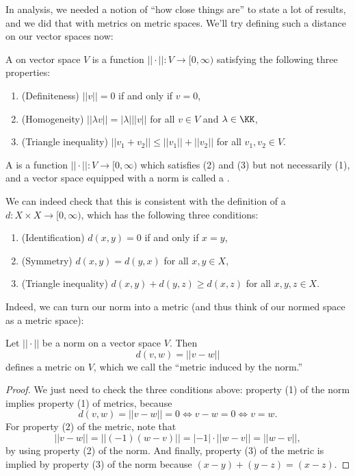 In analysis, we needed a notion of ``how close things are'' to state a lot of results, and we did that with metrics on metric spaces. We'll try defining such a distance on our vector spaces now:

\begin{definition}
A  on vector space $V$ is a function $||\cdot||: V \to [0, \infty)$ satisfying the following three properties:
\begin{enumerate}
    \item (Definiteness) $||v|| = 0$ if and only if $v = 0$,
    \item (Homogeneity) $||\lambda v|| = |\lambda| ||v||$ for all $v \in V$ and $\lambda \in \KK$,
    \item (Triangle inequality) $||v_1+v_2|| \le ||v_1|| + ||v_2||$ for all $v_1, v_2 \in V$.
\end{enumerate}
A  is a function $||\cdot||: V \to [0, \infty)$ which satisfies (2) and (3) but not necessarily (1), and a vector space equipped with a norm is called a .
\end{definition}

We can indeed check that this is consistent with the definition of a  $d: X \times X \to [0, \infty)$, which has the following three conditions:
\begin{enumerate}
    \item (Identification) $d(x, y) = 0$ if and only if $x = y$,
    \item (Symmetry) $d(x, y) = d(y, x)$ for all $x, y \in X$,
    \item (Triangle inequality) $d(x, y) + d(y, z) \ge d(x, z)$ for all $x, y, z \in X$.
\end{enumerate}

Indeed, we can turn our norm into a metric (and thus think of our normed space as a metric space):

\begin{proposition}
Let $||\cdot||$ be a norm on a vector space $V$. Then 
\[
    d(v, w) = ||v-w|| 
\]
defines a metric on $V$, which we call the ``metric induced by the norm.''
\end{proposition}
\begin{proof}
We just need to check the three conditions above: property (1) of the norm implies property (1) of metrics, because 
\[
    d(v, w) = ||v-w|| = 0 \iff v-w = 0 \iff v = w.
\]
For property (2) of the metric, note that 
\[
    ||v-w|| = ||(-1)(w-v)|| = |-1| \cdot ||w-v|| = ||w-v||,
\]
by using property (2) of the norm. And finally, property (3) of the metric is implied by property (3) of the norm because $(x-y) + (y-z) = (x-z)$.
\end{proof}

